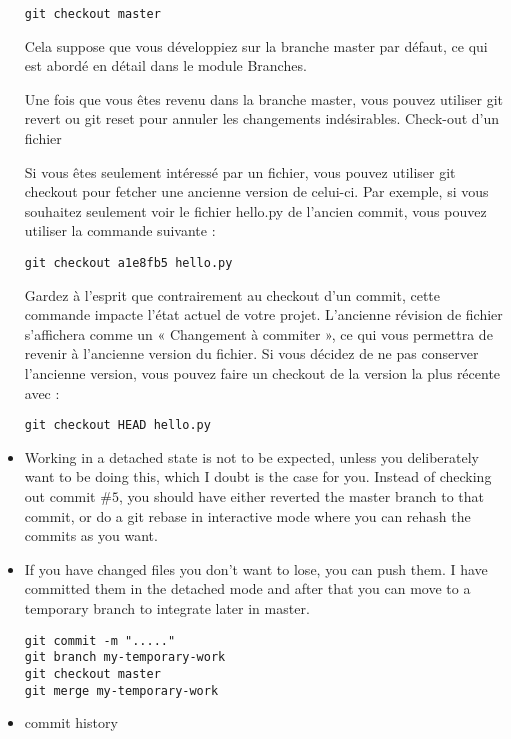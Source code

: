 \begin{itemize}
\begin{verbatim}
git checkout master
\end{verbatim}

Cela suppose que vous développiez sur la branche master par défaut, ce qui est abordé en détail dans le module Branches.

Une fois que vous êtes revenu dans la branche master, vous pouvez utiliser git revert ou git reset pour annuler les changements indésirables.
Check-out d'un fichier

Si vous êtes seulement intéressé par un fichier, vous pouvez utiliser git checkout pour fetcher une ancienne version de celui-ci. Par exemple, si vous souhaitez seulement voir le fichier hello.py de l'ancien commit, vous pouvez utiliser la commande suivante :

\begin{verbatim}
git checkout a1e8fb5 hello.py
\end{verbatim}

Gardez à l'esprit que contrairement au checkout d'un commit, cette commande impacte l'état actuel de votre projet. L'ancienne révision de fichier s'affichera comme un « Changement à commiter », ce qui vous permettra de revenir à l'ancienne version du fichier. Si vous décidez de ne pas conserver l'ancienne version, vous pouvez faire un checkout de la version la plus récente avec :

\begin{verbatim}
git checkout HEAD hello.py
\end{verbatim}

\item Working in a detached state is not to be expected, unless you deliberately want to be doing this, which I doubt is the case for you. Instead of checking out commit $\#5$, you should have either reverted the master branch to that commit, or do a git rebase in interactive mode where you can rehash the commits as you want.

\item If you have changed files you don't want to lose, you can push them. I have committed them in the detached mode and after that you can move to a temporary branch to integrate later in master.

\begin{verbatim}
git commit -m "....."
git branch my-temporary-work
git checkout master
git merge my-temporary-work
\end{verbatim}

\item commit history


\end{itemize}

